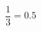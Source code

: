 \documentclass[preview]{standalone}
\begin{document}
\begin{equation}
\frac{1}{3} = 0.5
\end{equation}
\end{document}
